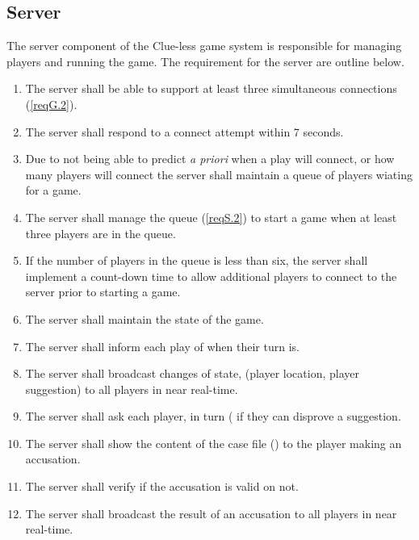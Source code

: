 \documentclass[10pt]{article}
\begin{document}
\subsection[Server]{Server} \label{serverReqs}
The server component of the Clue-less game system is responsible for managing players and running the game.  The requirement for the server are outline below.
\begin{enumerate}[label=S.\arabic*]
\item \label{reqS.1}The server shall be able to support at least three simultaneous connections (\ref{reqG.2}).
\item \label{reqS.12} The server shall respond to a connect attempt within 7 seconds.
\item \label{reqS.2} Due to not being able to predict {\em a priori} when a play will connect, or how many players will connect the server shall maintain a queue of players wiating for a game.
\item \label{reqS.3} The server shall manage the queue (\ref{reqS.2}) to start a game when at least three players are in the queue.
\item \label{reqS.14} If the number of players in the queue is less than six, the server shall implement a count-down time to allow additional players to connect to the server prior to starting a game.
\item \label{reqS.5} The server shall maintain the state of the game.
\item \label{reqS.6} The server shall inform each play of when their turn is.
\item \label{reqS.7} The server shall broadcast changes of state, (player location, player suggestion) to all players in near real-time.
\item \label{reqS.8} The server shall ask each player, in turn (\label{reqG.26} if they can disprove a suggestion.
\item \label{reqS.9} The server shall show the content of the case file (\label{G.11}) to the player making an accusation.
\item \label{reqS.10} The server shall verify if the accusation is valid on not.
\item \label{reqS.11} The server shall broadcast the result of an accusation to all players in near real-time.
\end{enumerate}
\end{document}
